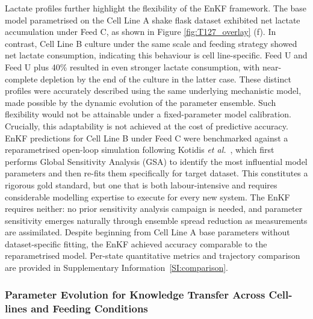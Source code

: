 Lactate profiles further highlight the flexibility of the EnKF framework. The base model parametrised on the Cell Line A shake flask dataset exhibited net lactate accumulation under Feed C, as shown in Figure \ref{fig:T127_overlay} (f). In contrast, Cell Line B culture under the same scale and feeding strategy showed net lactate consumption, indicating this behaviour is cell line-specific. Feed U and Feed U plus 40\% resulted in even stronger lactate consumption, with near-complete depletion by the end of the culture in the latter case. These distinct profiles were accurately described using the same underlying mechanistic model, made possible by the dynamic evolution of the parameter ensemble. Such flexibility would not be attainable under a fixed-parameter model calibration. {\color{blue} Crucially, this adaptability is not achieved at the cost of predictive accuracy. EnKF predictions for Cell Line B under Feed C were benchmarked against a reparametrised open-loop simulation following Kotidis \textit{et al.}~\cite{Kotidis2019UseCultures}, which first performs Global Sensitivity Analysis (GSA) to identify the most influential model parameters and then re-fits them specifically for target dataset. This constitutes a rigorous gold standard, but one that is both labour-intensive and requires considerable modelling expertise to execute for every new system. The EnKF requires neither: no prior sensitivity analysis campaign is needed, and parameter sensitivity emerges naturally through ensemble spread reduction as measurements are assimilated. Despite beginning from Cell Line A base parameters without dataset-specific fitting, the EnKF achieved accuracy comparable to the reparametrised model. Per-state quantitative metrics and trajectory comparison are provided in Supplementary Information~\ref{SI:comparison}.}

\subsubsection{Parameter Evolution for Knowledge Transfer Across Cell-lines and Feeding Conditions}

